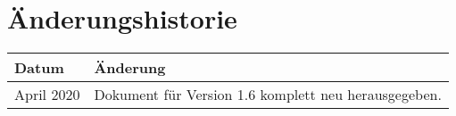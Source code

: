 \chapter{Änderungshistorie}
\begin{tabularx}{\textwidth}{l|X}
  Datum & Änderung \\
  \hline
  \hline
  April 2020 &
    Dokument für Version 1.6 komplett neu herausgegeben.
\end{tabularx}
